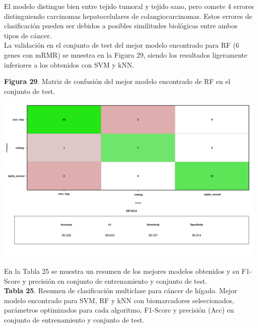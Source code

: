 El modelo distingue bien entre tejido tumoral y tejido sano, pero comete 4 errores distinguiendo carcinomas hepatocelulares de colangiocarcinomas. Estos errores de clasificación pueden ser debidos a posibles similitudes biológicas entre ambos tipos de cáncer. \\

La validación en el conjunto de test del mejor modelo encontrado para RF (6 genes con mRMR) se muestra en la Figura 29, siendo los resultados ligeramente inferiores a los obtenidos con SVM y kNN.\\

\begin{center}
\textbf{Figura 29}. Matriz de confusión del mejor modelo encontrado de RF en el conjunto de test.
\end{center}
\begin{center}
	\includegraphics[width=1\textwidth]{figuras/29_higado_multiclase_25_rf_matriz_confusion_mejor_metodo_mejorado.png} 
\end{center}

En la Tabla 25 se muestra un resumen de los mejores modelos obtenidos y su F1-Score y precisión en conjunto de entrenamiento y conjunto de test.\\

\textbf{Tabla 25}. Resumen de clasificación multiclase para cáncer de hígado. Mejor modelo encontrado para SVM, RF y kNN con biomarcadores seleccionados, parámetros optimizados para cada algoritmo, F1-Score y precisión (Acc) en conjunto de entrenamiento y conjunto de test.

